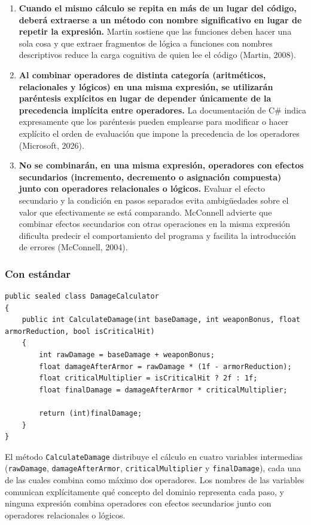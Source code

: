 \begin{enumerate}
  \item \textbf{Cuando el mismo cálculo se repita en más de un lugar del código, deberá extraerse a un método con nombre significativo en lugar de repetir la expresión.} Martin sostiene que las funciones deben hacer una sola cosa y que extraer fragmentos de lógica a funciones con nombres descriptivos reduce la carga cognitiva de quien lee el código (Martin, 2008).

  \item \textbf{Al combinar operadores de distinta categoría (aritméticos, relacionales y lógicos) en una misma expresión, se utilizarán paréntesis explícitos en lugar de depender únicamente de la precedencia implícita entre operadores.} La documentación de C\# indica expresamente que los paréntesis pueden emplearse para modificar o hacer explícito el orden de evaluación que impone la precedencia de los operadores (Microsoft, 2026).

  \item \textbf{No se combinarán, en una misma expresión, operadores con efectos secundarios (incremento, decremento o asignación compuesta) junto con operadores relacionales o lógicos.} Evaluar el efecto secundario y la condición en pasos separados evita ambigüedades sobre el valor que efectivamente se está comparando. McConnell advierte que combinar efectos secundarios con otras operaciones en la misma expresión dificulta predecir el comportamiento del programa y facilita la introducción de errores (McConnell, 2004).
\end{enumerate}

\subsubsection{Con estándar}

\begin{lstlisting}[style=csharpstyle]
public sealed class DamageCalculator
{
    public int CalculateDamage(int baseDamage, int weaponBonus, float armorReduction, bool isCriticalHit)
    {
        int rawDamage = baseDamage + weaponBonus;
        float damageAfterArmor = rawDamage * (1f - armorReduction);
        float criticalMultiplier = isCriticalHit ? 2f : 1f;
        float finalDamage = damageAfterArmor * criticalMultiplier;

        return (int)finalDamage;
    }
}
\end{lstlisting}

El método \texttt{CalculateDamage} distribuye el cálculo en cuatro variables intermedias (\texttt{rawDamage}, \texttt{damageAfterArmor}, \texttt{criticalMultiplier} y \texttt{finalDamage}), cada una de las cuales combina como máximo dos operadores. Los nombres de las variables comunican explícitamente qué concepto del dominio representa cada paso, y ninguna expresión combina operadores con efectos secundarios junto con operadores relacionales o lógicos.

